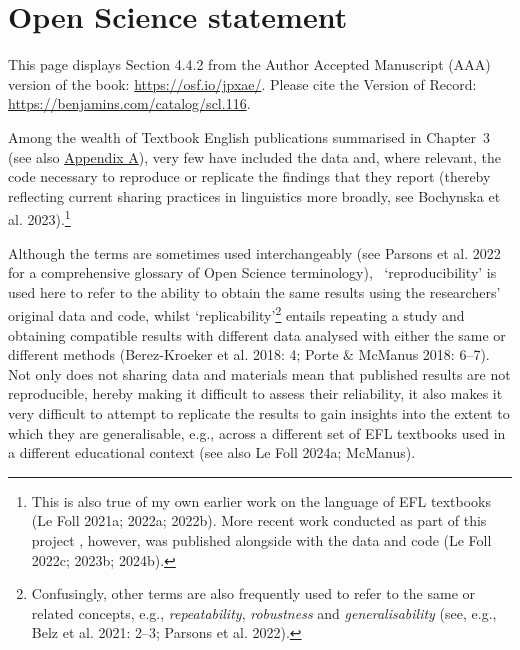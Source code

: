 \documentclass[
  letterpaper,
  DIV=11,
  numbers=noendperiod]{scrreprt}
\begin{document}

\chapter{Open Science statement}\label{open-science-statement}

\begin{tcolorbox}[enhanced jigsaw, toprule=.15mm, coltitle=black, rightrule=.15mm, colframe=quarto-callout-note-color-frame, titlerule=0mm, bottomrule=.15mm, colbacktitle=quarto-callout-note-color!10!white, colback=white, arc=.35mm, opacitybacktitle=0.6, toptitle=1mm, bottomtitle=1mm, leftrule=.75mm, left=2mm, title=\textcolor{quarto-callout-note-color}{\faInfo}\hspace{0.5em}{Note}, opacityback=0, breakable]

This page displays Section 4.4.2 from the Author Accepted Manuscript
(AAA) version of the book: \url{https://osf.io/jpxae/}. Please cite the
Version of Record: \url{https://benjamins.com/catalog/scl.116}.

\end{tcolorbox}

Among the wealth of Textbook English publications summarised in
Chapter~3 (see also
\href{https://elenlefoll.github.io/TextbookMDA/AppendixA.html}{Appendix
A}), very few have included the data and, where relevant, the code
necessary to reproduce or replicate the findings that they report
(thereby reflecting current sharing practices in linguistics more
broadly, see Bochynska et al. 2023).\footnote{This is also true of my
  own earlier work on the language of EFL textbooks (Le Foll 2021a;
  2022a; 2022b). More recent work conducted as part of this project ,
  however, was published alongside with the data and code (Le Foll
  2022c; 2023b; 2024b).}

Although the terms are sometimes used interchangeably (see Parsons et
al. 2022 for a comprehensive glossary of Open Science terminology),
~`reproducibility' is used here to refer to the ability to obtain the
same results using the researchers' original data and code, whilst
`replicability'\footnote{Confusingly, other terms are also frequently
  used to refer to the same or related concepts, e.g.,
  \emph{repeatability}, \emph{robustness} and \emph{generalisability}
  (see, e.g., Belz et al. 2021: 2--3; Parsons et al. 2022).} entails
repeating a study and obtaining compatible results with different data
analysed with either the same or different methods (Berez-Kroeker et al.
2018: 4; Porte \& McManus 2018: 6--7). Not only does not sharing data
and materials mean that published results are not reproducible, hereby
making it difficult to assess their reliability, it also makes it very
difficult to attempt to replicate the results to gain insights into the
extent to which they are generalisable, e.g., across a different set of
EFL textbooks used in a different educational context (see also Le Foll
2024a; McManus).
\end{document}
